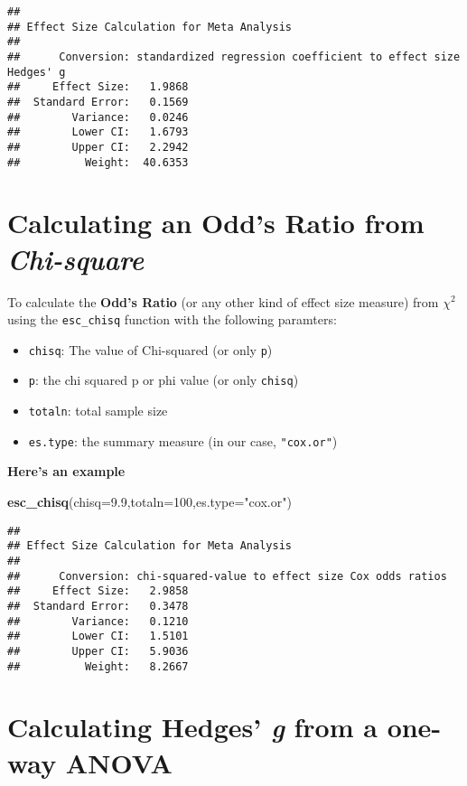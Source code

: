 \documentclass[]{book}
\newenvironment{Shaded}{\begin{snugshade}}{\end{snugshade}}
\newcommand{\KeywordTok}[1]{\textcolor[rgb]{0.13,0.29,0.53}{\textbf{#1}}}
\newcommand{\DataTypeTok}[1]{\textcolor[rgb]{0.13,0.29,0.53}{#1}}
\newcommand{\DecValTok}[1]{\textcolor[rgb]{0.00,0.00,0.81}{#1}}
\newcommand{\FloatTok}[1]{\textcolor[rgb]{0.00,0.00,0.81}{#1}}
\newcommand{\StringTok}[1]{\textcolor[rgb]{0.31,0.60,0.02}{#1}}
\newcommand{\NormalTok}[1]{#1}
\providecommand{\tightlist}{%
  \setlength{\itemsep}{0pt}\setlength{\parskip}{0pt}}
\theoremstyle{definition}
\theoremstyle{definition}
\theoremstyle{definition}
\theoremstyle{remark}
\begin{document}
\begin{verbatim}
## 
## Effect Size Calculation for Meta Analysis
## 
##      Conversion: standardized regression coefficient to effect size Hedges' g
##     Effect Size:   1.9868
##  Standard Error:   0.1569
##        Variance:   0.0246
##        Lower CI:   1.6793
##        Upper CI:   2.2942
##          Weight:  40.6353
\end{verbatim}

\hypertarget{c}{\section{\texorpdfstring{Calculating an Odd's Ratio from
\emph{Chi-square}}{Calculating an Odd's Ratio from Chi-square}}\label{c}}

To calculate the \textbf{Odd's Ratio} (or any other kind of effect size
measure) from \(\chi^2\) using the \texttt{esc\_chisq} function with the
following paramters:

\begin{itemize}
\tightlist
\item
  \texttt{chisq}: The value of Chi-squared (or only \texttt{p})
\item
  \texttt{p}: the chi squared p or phi value (or only \texttt{chisq})
\item
  \texttt{totaln}: total sample size
\item
  \texttt{es.type}: the summary measure (in our case, \texttt{"cox.or"})
\end{itemize}

 \textbf{Here's an example}

\begin{Shaded}
\begin{Highlighting}[]
\KeywordTok{esc_chisq}\NormalTok{(}\DataTypeTok{chisq=}\FloatTok{9.9}\NormalTok{,}\DataTypeTok{totaln=}\DecValTok{100}\NormalTok{,}\DataTypeTok{es.type=}\StringTok{"cox.or"}\NormalTok{)}
\end{Highlighting}
\end{Shaded}

\begin{verbatim}
## 
## Effect Size Calculation for Meta Analysis
## 
##      Conversion: chi-squared-value to effect size Cox odds ratios
##     Effect Size:   2.9858
##  Standard Error:   0.3478
##        Variance:   0.1210
##        Lower CI:   1.5101
##        Upper CI:   5.9036
##          Weight:   8.2667
\end{verbatim}

\hypertarget{d}{\section{\texorpdfstring{Calculating Hedges' \emph{g}
from a one-way
ANOVA}{Calculating Hedges' g from a one-way ANOVA}}\label{d}}
\end{document}

